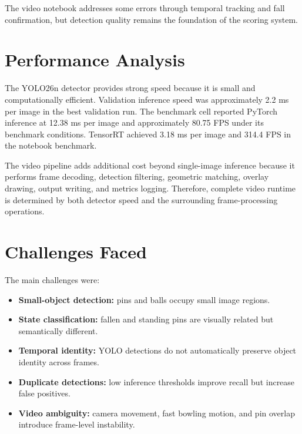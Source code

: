 \documentclass[12pt,a4paper]{article}
\begin{document}
The video notebook addresses some errors through temporal tracking and fall confirmation, but detection quality remains the foundation of the scoring system.


\section{Performance Analysis}

The YOLO26n detector provides strong speed because it is small and computationally efficient. Validation inference speed was approximately 2.2 ms per image in the best validation run. The benchmark cell reported PyTorch inference at 12.38 ms per image and approximately 80.75 FPS under its benchmark conditions. TensorRT achieved 3.18 ms per image and 314.4 FPS in the notebook benchmark.

The video pipeline adds additional cost beyond single-image inference because it performs frame decoding, detection filtering, geometric matching, overlay drawing, output writing, and metrics logging. Therefore, complete video runtime is determined by both detector speed and the surrounding frame-processing operations.


\section{Challenges Faced}

The main challenges were:
\begin{itemize}
    \item \textbf{Small-object detection:} pins and balls occupy small image regions.
    \item \textbf{State classification:} fallen and standing pins are visually related but semantically different.
    \item \textbf{Temporal identity:} YOLO detections do not automatically preserve object identity across frames.
    \item \textbf{Duplicate detections:} low inference thresholds improve recall but increase false positives.
    \item \textbf{Video ambiguity:} camera movement, fast bowling motion, and pin overlap introduce frame-level instability.
\end{itemize}
\end{document}
